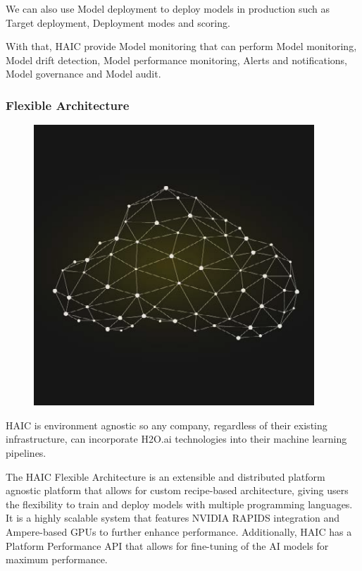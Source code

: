 \documentclass[12pt,a4paper]{report}
\begin{document}
We can also use Model deployment to deploy models in production such as Target deployment, Deployment modes and scoring.

With that, HAIC provide Model monitoring that can perform Model monitoring, Model drift detection, Model performance monitoring,
Alerts and notifications, Model governance and Model audit.

\subsubsection{Flexible Architecture}

\begin{figure}
\includegraphics[width=1\linewidth]{flexArc.png}
\end{figure}

HAIC is environment agnostic
so any company, regardless of their
existing infrastructure, can incorporate
H2O.ai technologies into their machine
learning pipelines.

The \ac{HAIC} Flexible Architecture is an extensible and distributed platform agnostic 
platform that allows for custom recipe-based architecture, giving users the flexibility to 
train and deploy models with multiple programming languages. It is a highly scalable system 
that features NVIDIA RAPIDS integration and Ampere-based GPUs to further enhance performance. 
Additionally, \ac{HAIC} has a Platform Performance API that allows for fine-tuning of the 
AI models for maximum performance.
\end{document}
